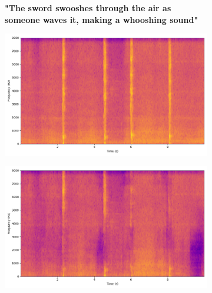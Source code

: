 \begin{figure}[!htbp]
    
    \begin{subfigure}[b]{0.185\textwidth}
        \centering
        \scriptsize\textbf{"The sword swooshes through the air as someone waves it, making a whooshing sound"}
        \vspace{5.0mm}
    \end{subfigure}
    \begin{subfigure}[b]{0.185\textwidth}
        \centering
        \includegraphics[width=\textwidth]{plots/sword_swoosh/clap mixture_spectrogram.png}
        \centering
    \end{subfigure}
    \begin{subfigure}[b]{0.185\textwidth}
        \centering
        \includegraphics[width=\textwidth]{plots/sword_swoosh/onepeace sep_spectrogram.png}
    \end{subfigure}
    \begin{subfigure}[b]{0.185\textwidth}
        \centering

\end{subfigure}
\end{figure}
